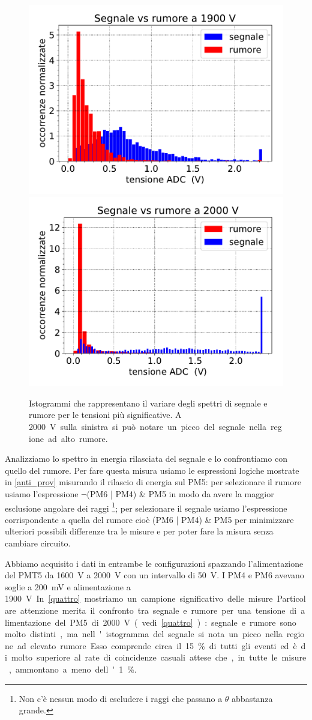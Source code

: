 \begin{figure}
	\hspace{-2cm}
	{\includegraphics[width=8 cm]{1900}}
	\qquad
	{\includegraphics[width=8 cm]{2000}}
	\caption{Istogrammi che rappresentano il variare degli spettri di segnale e rumore per le tensioni più significative.
	A \SI{2000}V sulla sinistra si può notare un picco del segnale nella regione ad alto rumore.}
	\label{quattro}
\end{figure}

Analizziamo lo spettro in energia rilasciata del segnale e lo confrontiamo con quello del rumore.
Per fare questa misura usiamo le espressioni logiche mostrate in \autoref{anti_prov}
misurando il rilascio di energia sul PM5:
per selezionare il rumore usiamo l'espressione $\neg$(PM6 | PM4) \& PM5
in modo da avere la maggior esclusione angolare dei raggi%
\footnote{Non c'è nessun modo di escludere i raggi che passano a $\theta$ abbastanza grande.};
per selezionare il segnale usiamo l'espressione corrispondente a quella del rumore cioè (PM6 | PM4) \& PM5
per minimizzare ulteriori possibili differenze tra le misure
e per poter fare la misura senza cambiare circuito.

Abbiamo acquisito i dati in entrambe le configurazioni spazzando
l'alimentazione del PMT5 da \SI{1600}{V} a \SI{2000}{V} con un intervallo di \SI{50}{V}.
I PM4 e PM6 avevano soglie a \SI{200}{mV} e alimentazione a \SI{1900}V.
In \autoref{quattro} mostriamo un campione significativo delle misure.

Particolare attenzione merita il confronto tra segnale e rumore
per una tensione di alimentazione del PM5 di \SI{2000}{V} (vedi \autoref{quattro}):
segnale e rumore sono molto distinti, ma nell'istogramma del segnale si nota un picco nella regione ad elevato rumore.
Esso comprende circa il \SI{15}\% di tutti gli eventi
ed è di molto superiore al rate di coincidenze casuali attese che,
in tutte le misure, ammontano a meno dell'1\%.
